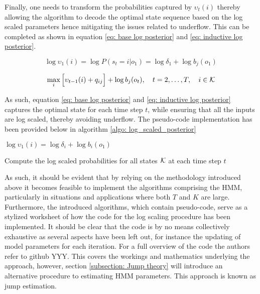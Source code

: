 Finally, one needs to transform the probabilities captured by $\upsilon_t(i)$ thereby allowing the algorithm to decode the optimal state sequence based on the log scaled parameters hence mitigating the issues related to underflow. This can be completed as shown in equation \ref{eq: base log posterior} and \ref{eq: inductive log posterior}.

\begin{equation}
    \log \upsilon_1(i) = \log P(s_t=i | o_1) = \log \delta_1 + \log b_j(o_{1}) 
    \label{eq: base log posterior}
\end{equation}

\begin{equation}
    \max_{i} \Big[\upsilon_{t-1}(i) + q_{ij}\Big] + \log b_j(o_t),
    \quad t=2,\ldots,T,
    \quad i \in\operatorname{\mathcal{K}}
    \label{eq: inductive log posterior}
\end{equation}

As such, equation \ref{eq: base log posterior} and \ref{eq: inductive log posterior} captures the optimal state for each time step $t$, while ensuring that all the inputs are log scaled, thereby avoiding underflow. The pseudo-code implementation has been provided below in algorithm \ref{algo: log_scaled_posterior}

\begin{algorithm}[H]
{$\log \upsilon_1(i) = \log \delta_i + \log b_i(o_1)$}\;


\caption{Compute the log scaled probabilities for all states $\operatorname{\mathcal{K}}$ at each time step $t$}
\label{algo: log_scaled_posterior}
\end{algorithm}

As such, it should be evident that by relying on the methodology introduced above it becomes feasible to implement the algorithms comprising the HMM, particularly in situations and applications where both $T$ and $K$ are large. Furthermore, the introduced algorithms, which contain pseudo-code, serve as a stylized worksheet of how the code for the log scaling procedure has been implemented. It should be clear that the code is by no means collectively exhaustive as several aspects have been left out, for instance the updating of model parameters for each iteration. For a full overview of the code the authors refer to github YYY. This covers the workings and mathematics underlying the \mle approach, however, section \ref{subsection: Jump theory} will introduce an alternative procedure to estimating HMM parameters. This approach is known as jump estimation. 


